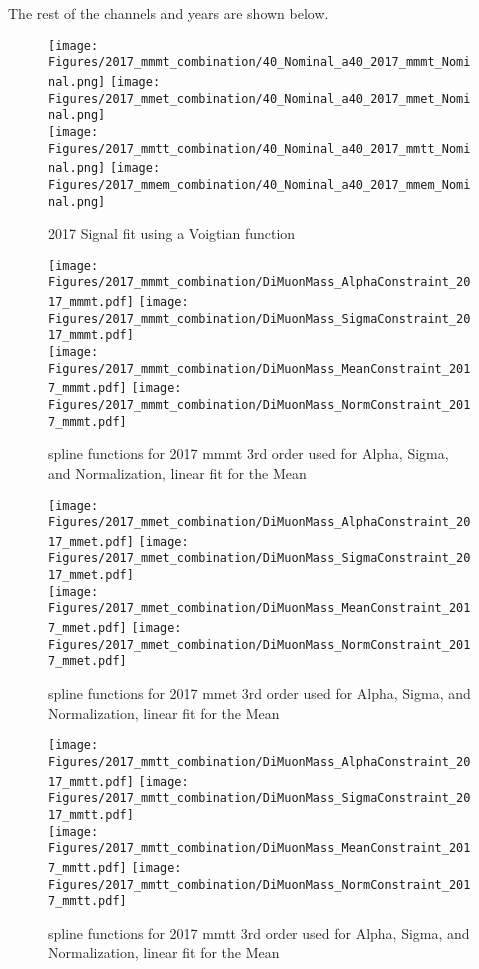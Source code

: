 The rest of the channels and years are shown below. 

\begin{figure}[ht!b]
  \centering
  \texttt{[image: Figures/2017\_mmmt\_combination/40\_Nominal\_a40\_2017\_mmmt\_Nominal.png]}
  \texttt{[image: Figures/2017\_mmet\_combination/40\_Nominal\_a40\_2017\_mmet\_Nominal.png]}\\
  \texttt{[image: Figures/2017\_mmtt\_combination/40\_Nominal\_a40\_2017\_mmtt\_Nominal.png]}
  \texttt{[image: Figures/2017\_mmem\_combination/40\_Nominal\_a40\_2017\_mmem\_Nominal.png]}\\
    \caption{\label{fig:2017_fit_sig} 2017 Signal fit using a Voigtian function}
\end{figure}

\begin{figure}[ht!b]
    \centering 
    \texttt{[image: Figures/2017\_mmmt\_combination/DiMuonMass\_AlphaConstraint\_2017\_mmmt.pdf]}
    \texttt{[image: Figures/2017\_mmmt\_combination/DiMuonMass\_SigmaConstraint\_2017\_mmmt.pdf]}\\
    \texttt{[image: Figures/2017\_mmmt\_combination/DiMuonMass\_MeanConstraint\_2017\_mmmt.pdf]}
    \texttt{[image: Figures/2017\_mmmt\_combination/DiMuonMass\_NormConstraint\_2017\_mmmt.pdf]}\\
    \caption{\label{fig:spline_2017_mmmt} spline functions for 2017 mmmt 3rd order used for Alpha, Sigma, and Normalization, linear fit for the Mean}
\end{figure}
\begin{figure}[ht!b]
    \centering 
    \texttt{[image: Figures/2017\_mmet\_combination/DiMuonMass\_AlphaConstraint\_2017\_mmet.pdf]}
    \texttt{[image: Figures/2017\_mmet\_combination/DiMuonMass\_SigmaConstraint\_2017\_mmet.pdf]}\\
    \texttt{[image: Figures/2017\_mmet\_combination/DiMuonMass\_MeanConstraint\_2017\_mmet.pdf]}
    \texttt{[image: Figures/2017\_mmet\_combination/DiMuonMass\_NormConstraint\_2017\_mmet.pdf]}\\
    \caption{\label{fig:spline_2017_mmet} spline functions for 2017 mmet 3rd order used for Alpha, Sigma, and Normalization, linear fit for the Mean}
\end{figure}
\begin{figure}[ht!b]
    \centering 
    \texttt{[image: Figures/2017\_mmtt\_combination/DiMuonMass\_AlphaConstraint\_2017\_mmtt.pdf]}
    \texttt{[image: Figures/2017\_mmtt\_combination/DiMuonMass\_SigmaConstraint\_2017\_mmtt.pdf]}\\
    \texttt{[image: Figures/2017\_mmtt\_combination/DiMuonMass\_MeanConstraint\_2017\_mmtt.pdf]}
    \texttt{[image: Figures/2017\_mmtt\_combination/DiMuonMass\_NormConstraint\_2017\_mmtt.pdf]}\\
    \caption{\label{fig:spline_2017_mmtt} spline functions for 2017 mmtt 3rd order used for Alpha, Sigma, and Normalization, linear fit for the Mean}
\end{figure}
